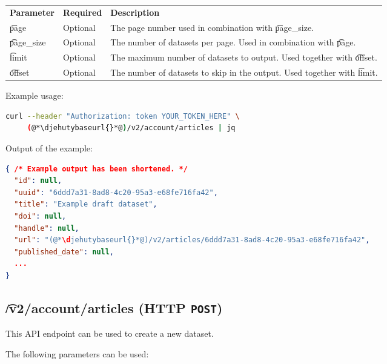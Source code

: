 \begin{tabularx}{\textwidth}{*{2}{!{\VRule[-1pt]}l}!{\VRule[-1pt]}X}
  \headrow
  \textbf{Parameter}   & \textbf{Required} & \textbf{Description}\\
  \t{page}             & Optional & The page number used in combination with
                                    \t{page\_size}.\\
  \t{page\_size}       & Optional & The number of datasets per page.  Used
                                    in combination with \t{page}.\\
  \t{limit}            & Optional & The maximum number of datasets to output.
                                    Used together with \t{offset}.\\
  \t{offset}           & Optional & The number of datasets to skip in the
                                    output.  Used together with \t{limit}.\\
\end{tabularx}

  Example usage:
\begin{lstlisting}[language=bash]
curl --header "Authorization: token YOUR_TOKEN_HERE" \
     (@*\djehutybaseurl{}*@)/v2/account/articles | jq
\end{lstlisting}

  Output of the example:
\begin{lstlisting}[language=JSON]
{ /* Example output has been shortened. */
  "id": null,
  "uuid": "6ddd7a31-8ad8-4c20-95a3-e68fe716fa42",
  "title": "Example draft dataset",
  "doi": null,
  "handle": null,
  "url": "(@*\djehutybaseurl{}*@)/v2/articles/6ddd7a31-8ad8-4c20-95a3-e68fe716fa42",
  "published_date": null,
  ...
}
\end{lstlisting}

\subsection{\t{/v2/account/articles} (HTTP \texttt{POST})}

  This API endpoint can be used to create a new dataset.

  The following parameters can be used:

